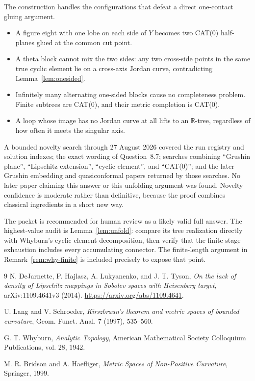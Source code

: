 \documentclass[11pt]{article}
\newcommand{\R}{\mathbb R}
\begin{document}
The construction handles the configurations that defeat a direct
one-contact gluing argument.
\begin{itemize}
\item A figure eight with one lobe on each side of $Y$ becomes two CAT(0)
half-planes glued at the common cut point.
\item A theta block cannot mix the two sides: any two cross-side points in
the same true cyclic element lie on a cross-axis Jordan curve, contradicting
Lemma~\ref{lem:onesided}.
\item Infinitely many alternating one-sided blocks cause no completeness
problem.  Finite subtrees are CAT(0), and their metric completion is CAT(0).
\item A loop whose image has no Jordan curve at all lifts to an $\R$-tree,
regardless of how often it meets the singular axis.
\end{itemize}

A bounded novelty search through 27 August 2026 covered the run registry and
solution indexes; the exact wording of Question~8.7; searches combining
``Grushin plane'', ``Lipschitz extension'', ``cyclic element'', and
``CAT(0)''; and the later Grushin embedding and quasiconformal papers returned
by those searches.  No later paper claiming this answer or this unfolding
argument was found.  Novelty confidence is moderate rather than definitive,
because the proof combines classical ingredients in a short new way.

The packet is recommended for human review as a likely valid full answer.
The highest-value audit is Lemma~\ref{lem:unfold}: compare its tree
realization directly with Whyburn's cyclic-element decomposition, then verify
that the finite-stage exhaustion includes every accumulating connector.  The
finite-length argument in Remark~\ref{rem:why-finite} is included precisely
to expose that point.

\begin{thebibliography}{9}
N. DeJarnette, P. Hajlasz, A. Lukyanenko, and J. T. Tyson,
\emph{On the lack of density of Lipschitz mappings in Sobolev spaces with
Heisenberg target}, arXiv:1109.4641v3 (2014).
\url{https://arxiv.org/abs/1109.4641}.

U. Lang and V. Schroeder,
\emph{Kirszbraun's theorem and metric spaces of bounded curvature},
Geom. Funct. Anal. 7 (1997), 535--560.

G. T. Whyburn,
\emph{Analytic Topology}, American Mathematical Society Colloquium
Publications, vol. 28, 1942.

M. R. Bridson and A. Haefliger,
\emph{Metric Spaces of Non-Positive Curvature}, Springer, 1999.
\end{thebibliography}
\end{document}
